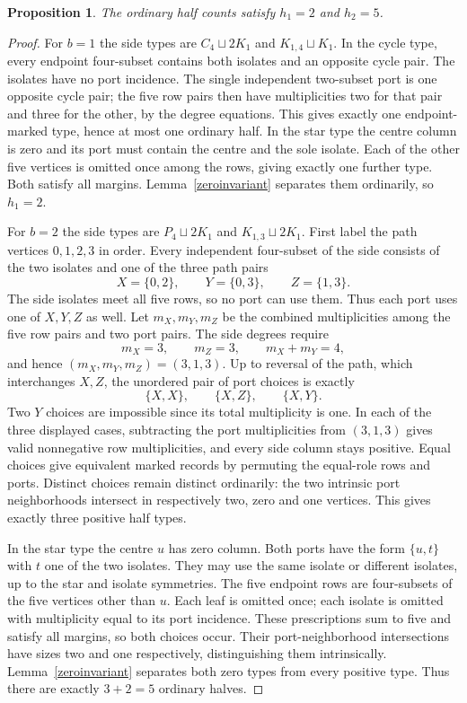 \documentclass[11pt]{article}
\newtheorem{proposition}[theorem]{Proposition}
\newcommand{\sq}{\sqcup}
\begin{document}
\begin{proposition}\label{hsmall}
The ordinary half counts satisfy $h_1=2$ and $h_2=5$.
\end{proposition}
\begin{proof}
For $b=1$ the side types are $C_4\sq2K_1$ and $K_{1,4}\sq K_1$.
In the cycle type, every endpoint four-subset contains both isolates
and an opposite cycle pair. The isolates have no port incidence. The
single independent two-subset port is one opposite cycle pair; the
five row pairs then have multiplicities two for that pair and three
for the other, by the degree equations. This gives exactly one
endpoint-marked type, hence at most one ordinary half. In the star
type the centre column is zero and its port must contain the centre
and the sole isolate. Each of the other five vertices is omitted once
among the rows, giving exactly one further type. Both satisfy all
margins. Lemma~\ref{zeroinvariant} separates them ordinarily, so $h_1=2$.

For $b=2$ the side types are $P_4\sq2K_1$ and $K_{1,3}\sq2K_1$.
First label the path vertices $0,1,2,3$ in order. Every independent
four-subset of the side consists of the two isolates and one of the
three path pairs
\[
 X=\{0,2\},\qquad Y=\{0,3\},\qquad Z=\{1,3\}.
\]
The side isolates meet all five rows, so no port can use them. Thus
each port uses one of $X,Y,Z$ as well. Let $m_X,m_Y,m_Z$ be the combined
multiplicities among the five row pairs and two port pairs. The side
degrees require
\[
 m_X=3,\qquad m_Z=3,\qquad m_X+m_Y=4,
\]
and hence $(m_X,m_Y,m_Z)=(3,1,3)$. Up to reversal of the path, which
interchanges $X,Z$, the unordered pair of port choices is exactly
\[
 \{X,X\},\qquad \{X,Z\},\qquad \{X,Y\}.
\]
Two $Y$ choices are impossible since its total multiplicity is one.
In each of the three displayed cases, subtracting the port multiplicities
from $(3,1,3)$ gives valid nonnegative row multiplicities, and every side
column stays positive. Equal choices give equivalent marked records by
permuting the equal-role rows and ports. Distinct choices remain distinct
ordinarily: the two intrinsic port neighborhoods intersect in respectively
two, zero and one vertices. This gives exactly three positive half types.

In the star type the centre $u$ has zero column. Both ports have the
form $\{u,t\}$ with $t$ one of the two isolates. They may use the same
isolate or different isolates, up to the star and isolate symmetries.
The five endpoint rows are four-subsets of the five vertices other than
$u$. Each leaf is omitted once; each isolate is omitted with multiplicity
equal to its port incidence. These prescriptions sum to five and satisfy
all margins, so both choices occur. Their port-neighborhood intersections
have sizes two and one respectively, distinguishing them intrinsically.
Lemma~\ref{zeroinvariant} separates both zero types from every positive
type. Thus there are exactly $3+2=5$ ordinary halves.
\end{proof}
\end{document}
